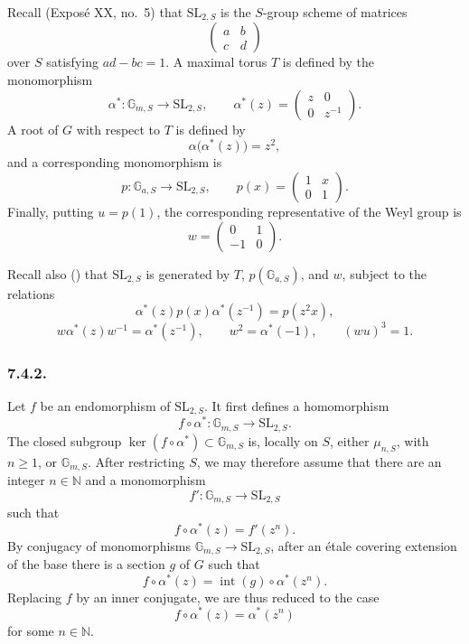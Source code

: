 Recall (Exposé XX, no.~5) that \(\mathrm{SL}_{2,S}\) is the
\(S\)-group scheme of matrices
\[
  \begin{pmatrix}a&b\\c&d\end{pmatrix}
\]
over \(S\) satisfying \(ad-bc=1\). A maximal torus \(T\) is defined
by the monomorphism
\[
  \alpha^*:\mathbb G_{m,S}\longrightarrow\mathrm{SL}_{2,S},
  \qquad
  \alpha^*(z)=
  \begin{pmatrix}z&0\\0&z^{-1}\end{pmatrix}.
\]
A root of \(G\) with respect to \(T\) is defined by
\[
  \alpha\bigl(\alpha^*(z)\bigr)=z^2,
\]
and a corresponding monomorphism is
\[
  p:\mathbb G_{a,S}\longrightarrow\mathrm{SL}_{2,S},
  \qquad
  p(x)=
  \begin{pmatrix}1&x\\0&1\end{pmatrix}.
\]
Finally, putting \(u=p(1)\), the corresponding representative of the
Weyl group is
\[
  w=
  \begin{pmatrix}0&1\\-1&0\end{pmatrix}.
\]

Recall also () that \(\mathrm{SL}_{2,S}\) is generated by
\(T\), \(p(\mathbb G_{a,S})\), and \(w\), subject to the relations
\[
  \alpha^*(z)p(x)\alpha^*(z^{-1})=p(z^2x),
\]
\[
  w\alpha^*(z)w^{-1}=\alpha^*(z^{-1}),
  \qquad
  w^2=\alpha^*(-1),
  \qquad
  (wu)^3=1.
\]

\subsubsection*{7.4.2.}

Let \(f\) be an endomorphism of \(\mathrm{SL}_{2,S}\). It first
defines a homomorphism
\[
  f\circ\alpha^*:\mathbb G_{m,S}\longrightarrow\mathrm{SL}_{2,S}.
\]
The closed subgroup
\(\ker(f\circ\alpha^*)\subset\mathbb G_{m,S}\) is, locally on \(S\),
either \(\mu_{n,S}\), with \(n\geq1\), or
\(\mathbb G_{m,S}\). After restricting \(S\), we may therefore assume
that there are an integer \(n\in\mathbb N\) and a monomorphism
\[
  f':\mathbb G_{m,S}\longrightarrow\mathrm{SL}_{2,S}
\]
such that
\[
  f\circ\alpha^*(z)=f'(z^n).
\]
By conjugacy of monomorphisms
\(\mathbb G_{m,S}\to\mathrm{SL}_{2,S}\), after an étale covering
extension of the base there is a section \(g\) of \(G\) such that
\[
  f\circ\alpha^*(z)
  =
  \operatorname{int}(g)\circ\alpha^*(z^n).
\]
Replacing \(f\) by an inner conjugate, we are thus reduced to the case
\[
  f\circ\alpha^*(z)=\alpha^*(z^n)
\]
for some \(n\in\mathbb N\).

